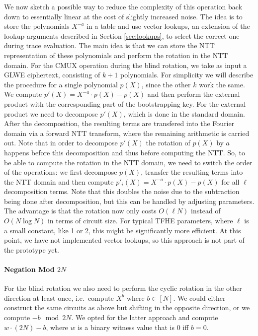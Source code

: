 \documentclass[final]{zamarep}
\begin{document}
We now sketch a possible way to reduce the complexity of this operation back down to essentially linear at the cost of slightly increased noise. The idea is to store the polynomials $X^{-a}$ in a table and use vector lookups, an extension of the lookup arguments described in Section \ref{sec:lookups}, to select the correct one during trace evaluation. The main idea is that we can store the NTT representation of these polynomials and perform the rotation in the NTT domain. For the CMUX operation during the blind rotation, we take as input a GLWE ciphertext, consisting of $k+1$ polynomials. For simplicity we will describe the procedure for a single polynomial $p(X)$, since the other $k$ work the same. We compute $p'(X) = X^{-a} \cdot p(X) - p(X)$ and then perform the external product with the corresponding part of the bootstrapping key. For the external product we need to decompose $p'(X)$, which is done in the standard domain. After the decomposition, the resulting terms are transfered into the Fourier domain via a forward NTT transform, where the remaining arithmetic is carried out. Note that in order to decompose $p'(X)$ the rotation of $p(X)$ by $a$ happens before this decomposition and thus before computing the NTT. So, to be able to compute the rotation in the NTT domain, we need to switch the order of the operations: we first decompose $p(X)$, transfer the resulting terms into the NTT domain and then compute $p'_i(X) = X^{-a} \cdot p(X) - p(X)$ for all $\ell$ decomposition terms. Note that this doubles the noise due to the subtraction being done after decomposition, but this can be handled by adjusting parameters. The advantage is that the rotation now only costs $O(\ell N)$ instead of $O(N \log N)$ in terms of circuit size. For typical TFHE parameters, where $\ell$ is a small constant, like 1 or 2, this might be significantly more efficient. At this point, we have not implemented vector lookups, so this approach is not part of the prototype yet.

\paragraph{Negation Mod $2N$}
For the blind rotation we also need to perform the cyclic rotation in the other direction at least once, i.e.\ compute $X^b$ where $b \in [N]$. We could either construct the same circuits as above but shifting in the opposite direction, or we compute $-b \mod 2N$. We opted for the latter approach and compute $w \cdot (2N) - b$, where $w$ is a binary witness value that is $0$ iff $b = 0$.
\end{document}
